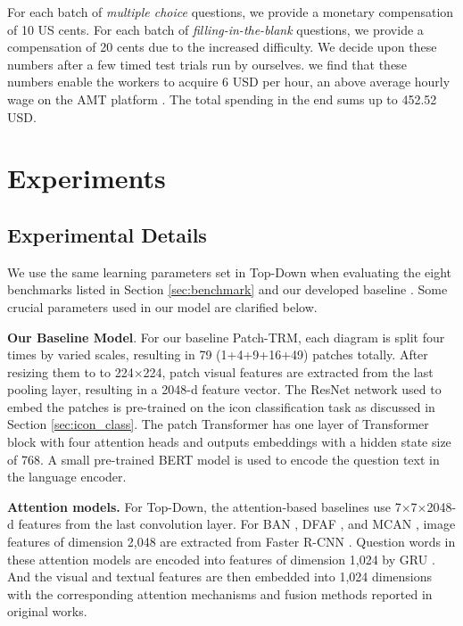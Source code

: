 \documentclass{article}
\begin{document}
For each batch of \textit{multiple choice} questions, we provide a monetary compensation of 10 US cents. For each batch of \textit{filling-in-the-blank} questions, we provide a compensation of 20 cents due to the increased difficulty. We decide upon these numbers after a few timed test trials run by ourselves. we find that these numbers enable the workers to acquire 6 USD per hour, an above average hourly wage on the AMT platform \cite{hara2018data}. The total spending in the end sums up to 452.52 USD.


\section{Experiments} 
\label{app_exp}

\subsection{Experimental Details}
\label{app_experiment_detail}

We use the same learning parameters set in Top-Down \cite{Anderson2017up} when evaluating the eight benchmarks listed in Section \ref{sec:benchmark} and our developed baseline . Some crucial parameters used in our model are clarified below. 

\textbf{Our Baseline Model}. For our baseline Patch-TRM, each diagram is split four times by varied scales, resulting in 79 (1+4+9+16+49) patches totally. After resizing them to to 224$\times$224, patch visual features are extracted from the last pooling layer, resulting in a 2048-d feature vector. The ResNet network used to embed the patches is pre-trained on the icon classification task as discussed in Section \ref{sec:icon_class}. The patch Transformer has one layer of Transformer block with four attention heads and outputs embeddings with a hidden state size of 768. A small pre-trained BERT model \cite{turc2019well} is used to encode the question text in the language encoder. 

\textbf{Attention models.} For Top-Down, the attention-based baselines use 7$\times$7$\times$2048-d features from the last convolution layer. For BAN \cite{Kim2018}, DFAF \cite{gao2019dynamic}, and MCAN \cite{yu2019mcan}, image features of dimension 2,048 are extracted from Faster R-CNN \cite{ren2015faster}. Question words in these attention models are encoded into features of dimension 1,024 by GRU \cite{cho2014learning}. And the visual and textual features are then embedded into 1,024 dimensions with the corresponding attention mechanisms and fusion methods reported in original works. 
\end{document}
